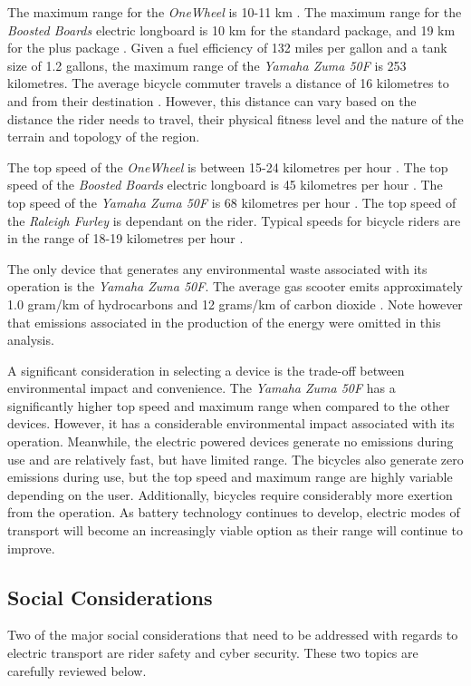 The maximum range for the \textit{OneWheel} is 10-11 km \cite{wheelcost}.
The maximum range for the \textit{Boosted Boards} electric longboard is 10 km for the standard package, and 19 km for the plus package \cite{boardcost}.
Given a fuel efficiency of 132 miles per gallon and a tank size of 1.2 gallons, the maximum range of the \textit{Yamaha Zuma 50F} is 253 kilometres.
The average bicycle commuter travels a distance of 16 kilometres to and from their destination \cite{BikePaper}. However, this distance can vary based on the distance the rider needs to travel, their physical fitness level and the nature of the terrain and topology of the region.
\par
The top speed of the \textit{OneWheel} is between 15-24 kilometres per hour \cite{wheelcost}.
The top speed of the \textit{Boosted Boards} electric longboard is 45 kilometres per hour \cite{boardcost}.
The top speed of the \textit{Yamaha Zuma 50F} is 68 kilometres per hour \cite{Yamaha}.
The top speed of the \textit{Raleigh Furley} is dependant on the rider. Typical speeds for bicycle riders are in the range of 18-19 kilometres per hour \cite{bikespeed}.
\par
The only device that generates any environmental waste associated with its operation is the \textit{Yamaha Zuma 50F}. The average gas scooter emits approximately 1.0 gram/km of hydrocarbons and 12 grams/km of carbon dioxide \cite{emissions}. Note however that emissions associated in the production of the energy were omitted in this analysis. 
\par
A significant consideration in selecting a device is the trade-off between environmental impact and convenience.
The \textit{Yamaha Zuma 50F} has a significantly higher top speed and maximum range when compared to the other devices. 
However, it has a considerable environmental impact associated with its operation. Meanwhile, the electric powered devices generate no emissions during use and are relatively fast, but have limited range. 
The bicycles also generate zero emissions during use, but the top speed and maximum range are highly variable depending on the user.
Additionally, bicycles require considerably more exertion from the operation. 
As battery technology continues to develop, electric modes of transport will become an increasingly viable option as their range will continue to improve.

\subsection{Social Considerations}
Two of the major social considerations that need to be addressed with regards to electric transport are rider safety and cyber security. 
These two topics are carefully reviewed below.

